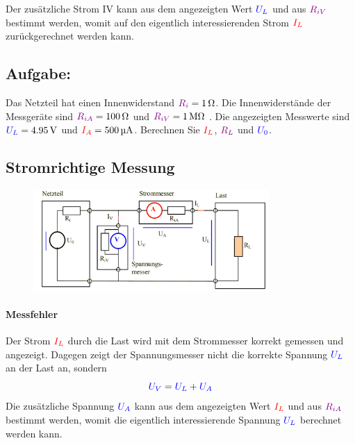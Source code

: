 \documentclass[11pt,a4paper,titlepage,parskip=half]{scrreprt}
\begin{document}
           Der zusätzliche Strom IV kann aus dem angezeigten Wert $\textcolor{blue}{U_L}$ und aus $\textcolor{violet}{R_{iV}}$ bestimmt werden, womit auf den eigentlich interessierenden Strom $\textcolor{red}{I_L}$ zurückgerechnet werden kann.
            
           
           \subsection{Aufgabe:}  Das Netzteil hat einen Innenwiderstand $\textcolor{violet}{R_i} = \SI{1}{\ohm}$. Die Innenwiderstände der Messgeräte sind $\textcolor{violet}{R_{iA}} = \SI{100}{\ohm}$ und $\textcolor{violet}{R_{iV}} = \SI{1}{\mega\ohm}$ . Die angezeigten Messwerte sind $\textcolor{blue}{U_L} = \SI{4,95}{\volt}$ und $\textcolor{red}{I_A} = \SI{500}{\micro\ampere}$.  Berechnen Sie $\textcolor{red}{I_L}$, $\textcolor{violet}{R_L}$ und $\textcolor{blue}{U_0}$.
           
           
           
         \subsection{Stromrichtige Messung}
         
           \begin{figure}[H]
             \begin{center}
                 \includegraphics[width=0.8\textwidth]{./Strom.png}
             \end{center}
         \end{figure}
         
         \paragraph{Messfehler}
         Der Strom $\textcolor{red}{I_L}$ durch die Last wird mit dem Strommesser korrekt gemessen und angezeigt.
         Dagegen zeigt der Spannungsmesser nicht die korrekte Spannung $\textcolor{blue}{U_L}$ an der Last an, sondern
         \begin{equation*}
             \textcolor{blue}{U_V} = \textcolor{blue}{U_L} + \textcolor{blue}{U_A}
         \end{equation*}
         Die zusätzliche Spannung $\textcolor{blue}{U_A}$ kann aus dem angezeigten Wert $\textcolor{red}{I_L}$ und aus $\textcolor{violet}{R_{iA}}$ bestimmt
         werden, womit die eigentlich interessierende Spannung $\textcolor{blue}{U_L}$ berechnet werden kann.
          
\end{document}
